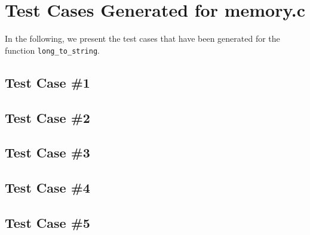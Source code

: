 \newpage
\section{Test Cases Generated for memory.c}

In the following, we present the test cases that have been generated for the function \texttt{long\_to\_string}.

\subsection{Test Case \#1}


\subsection{Test Case \#2}


\subsection{Test Case \#3}


\subsection{Test Case \#4}


\subsection{Test Case \#5}


